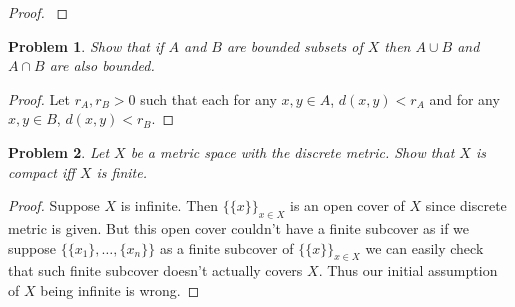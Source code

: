 \documentclass[paper=a4, fontsize=11pt]{scrartcl}
\newcommand{\nextline}{$ $ \newline \vspace{-0.15in}}
\newtheorem{problem}{Problem}
\begin{document}
\begin{proof}
\nextline
{}
\end{proof}

\begin{problem}
	Show that if $A$ and $B$ are bounded subsets of $X$ then $A \cup B$ and $A \cap B$ are also bounded.
\end{problem}

\begin{proof}
Let $r_A,r_B>0$ such that each for any $x,y\in A$, $d(x,y)<r_A$ and for any $x,y \in B$, $d(x,y)<r_B$.
\end{proof}

\begin{problem}
	Let $X$ be a metric space with the discrete metric. Show that $X$ is compact iff $X$ is finite.
\end{problem} 

\begin{proof}
	Suppose $X$ is infinite. Then $\{ \{x\} \}_{x\in X}$ is an open cover of $X$ since discrete metric is given. But this open cover couldn't have a finite subcover as if we suppose $\{\{x_1\},\dots,\{x_n\} \}$ as a finite subcover of $\{\{x\}\}_{x\in X}$ we can easily check that such finite subcover doesn't actually covers $X$. Thus our initial assumption of $X$ being infinite is wrong. 
\end{proof}
\end{document}
